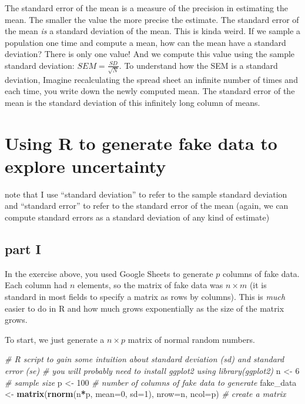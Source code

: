 \documentclass[]{book}
\newenvironment{Shaded}{\begin{snugshade}}{\end{snugshade}}
\newcommand{\KeywordTok}[1]{\textcolor[rgb]{0.13,0.29,0.53}{\textbf{#1}}}
\newcommand{\DataTypeTok}[1]{\textcolor[rgb]{0.13,0.29,0.53}{#1}}
\newcommand{\DecValTok}[1]{\textcolor[rgb]{0.00,0.00,0.81}{#1}}
\newcommand{\StringTok}[1]{\textcolor[rgb]{0.31,0.60,0.02}{#1}}
\newcommand{\CommentTok}[1]{\textcolor[rgb]{0.56,0.35,0.01}{\textit{#1}}}
\newcommand{\OperatorTok}[1]{\textcolor[rgb]{0.81,0.36,0.00}{\textbf{#1}}}
\newcommand{\NormalTok}[1]{#1}
\begin{document}
The standard error of the mean is a measure of the precision in
estimating the mean. The smaller the value the more precise the
estimate. The standard error of the mean \emph{is} a standard deviation
of the mean. This is kinda weird. If we sample a population one time and
compute a mean, how can the mean have a standard deviation? There is
only one value! And we compute this value using the sample standard
deviation: \(SEM = \frac{SD}{\sqrt{N}}\). To understand how the SEM is a
standard deviation, Imagine recalculating the spread sheet an infinite
number of times and each time, you write down the newly computed mean.
The standard error of the mean is the standard deviation of this
infinitely long column of means.

\section{Using R to generate fake data to explore
uncertainty}\label{using-r-to-generate-fake-data-to-explore-uncertainty}

note that I use ``standard deviation'' to refer to the sample standard
deviation and ``standard error'' to refer to the standard error of the
mean (again, we can compute standard errors as a standard deviation of
any kind of estimate)

\subsection{part I}\label{part-i}

In the exercise above, you used Google Sheets to generate \(p\) columns
of fake data. Each column had \(n\) elements, so the matrix of fake data
was \(n \times m\) (it is standard in most fields to specify a matrix as
rows by columns). This is \emph{much} easier to do in R and how much
grows exponentially as the size of the matrix grows.

To start, we just generate a \(n \times p\) matrix of normal random
numbers.

\begin{Shaded}
\begin{Highlighting}[]
\CommentTok{# R script to gain some intuition about standard deviation (sd) and standard error (se)}
\CommentTok{# you will probably need to install ggplot2 using library(ggplot2) }
\NormalTok{n <-}\StringTok{ }\DecValTok{6} \CommentTok{# sample size}
\NormalTok{p <-}\StringTok{ }\DecValTok{100} \CommentTok{# number of columns of fake data to generate}
\NormalTok{fake_data <-}\StringTok{ }\KeywordTok{matrix}\NormalTok{(}\KeywordTok{rnorm}\NormalTok{(n}\OperatorTok{*}\NormalTok{p, }\DataTypeTok{mean=}\DecValTok{0}\NormalTok{, }\DataTypeTok{sd=}\DecValTok{1}\NormalTok{), }\DataTypeTok{nrow=}\NormalTok{n, }\DataTypeTok{ncol=}\NormalTok{p) }\CommentTok{# create a matrix}
\end{Highlighting}
\end{Shaded}
\end{document}
